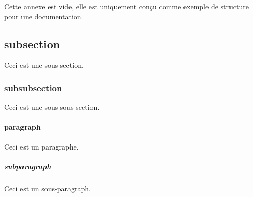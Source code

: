 

Cette annexe est vide, elle est uniquement conçu comme exemple de structure
pour une documentation.


\subsection{subsection}

Ceci est une sous-section.

\subsubsection{subsubsection}

Ceci est une sous-sous-section.

\paragraph{paragraph}
Ceci est un paragraphe.

\subparagraph{subparagraph}
Ceci est un sous-paragraph.

